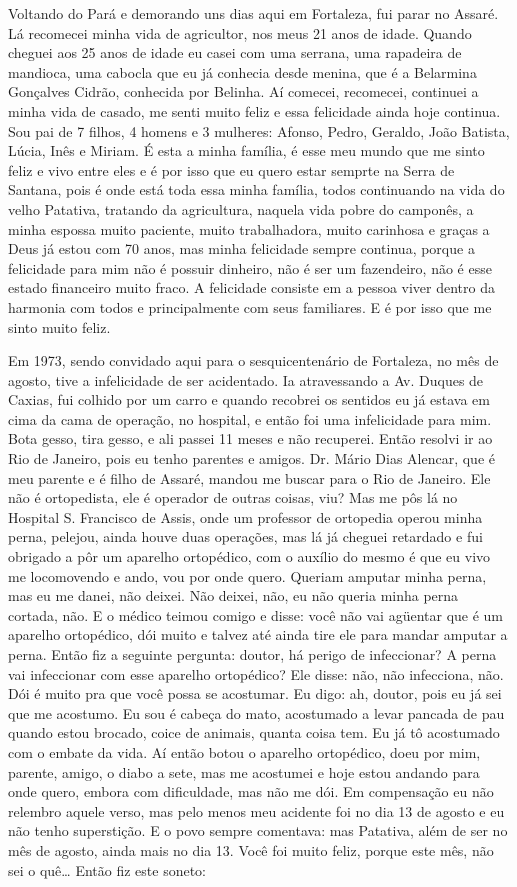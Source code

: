 Voltando do Pará e demorando uns dias aqui em Fortaleza, fui parar no
Assaré. Lá recomecei minha vida de agricultor, nos meus 21 anos de
idade. Quando cheguei aos 25 anos de idade eu casei com uma serrana, uma
rapadeira de mandioca, uma cabocla que eu já conhecia desde menina,
que é a Belarmina Gonçalves Cidrão, conhecida por Belinha. Aí comecei,
recomecei, continuei a minha vida de casado, me senti muito feliz e essa
felicidade ainda hoje continua. Sou pai de 7 filhos, 4 homens e 3
mulheres: Afonso, Pedro, Geraldo, João Batista, Lúcia, Inês e Miriam.
É esta a minha família, é esse meu mundo que me sinto feliz e vivo entre
eles e é por isso que eu quero estar semprte na Serra de Santana, pois é
onde está toda essa minha família, todos continuando na vida do velho
Patativa, tratando da agricultura, naquela vida pobre do camponês, a
minha espossa muito paciente, muito trabalhadora, muito carinhosa e
graças a Deus já estou com 70 anos, mas minha felicidade sempre
continua, porque a felicidade para mim não é possuir dinheiro, não é ser
um fazendeiro, não é esse estado financeiro muito fraco. A felicidade
consiste em a pessoa viver dentro da harmonia com todos e principalmente
com seus familiares. E é por isso que me sinto muito feliz.

Em 1973, sendo convidado aqui para o sesquicentenário de Fortaleza, no
mês de agosto, tive a infelicidade de ser acidentado. Ia atravessando a
Av. Duques de Caxias, fui colhido por um carro e quando recobrei os sentidos eu já estava em cima
da cama de operação, no hospital, e então foi uma infelicidade para mim.
Bota gesso, tira gesso, e ali passei 11 meses e não recuperei. Então
resolvi ir ao Rio de Janeiro, pois eu tenho parentes e amigos. Dr. Mário
Dias Alencar, que é meu parente e é filho de Assaré, mandou me buscar
para o Rio de Janeiro. Ele não é ortopedista, ele é operador de outras
coisas, viu? Mas me pôs lá no Hospital
S. Francisco de Assis, onde um professor de ortopedia operou minha
perna, pelejou, ainda houve duas operações, mas lá já cheguei retardado
e fui obrigado a pôr um aparelho ortopédico, com o auxílio do mesmo é
que eu vivo me locomovendo e ando, vou por onde quero. Queriam amputar
minha perna, mas eu me danei, não deixei. Não deixei, não, eu não queria
minha perna cortada, não. E o médico teimou comigo e disse: você não vai
agüentar que é um aparelho ortopédico, dói muito e talvez até ainda tire
ele para mandar amputar a perna. Então fiz a seguinte pergunta:
doutor, há perigo de infeccionar? A perna vai infeccionar com esse
aparelho ortopédico? Ele disse: não, não infecciona, não. Dói é muito
pra que você possa se acostumar. Eu digo: ah, doutor, pois eu já sei
que me acostumo. Eu sou é cabeça do mato, acostumado a levar pancada de
pau quando estou brocado, coice de animais, quanta coisa tem. Eu já tô
acostumado com o embate da vida. Aí então botou o aparelho ortopédico,
doeu por mim, parente, amigo, o diabo a sete, mas me acostumei e hoje
estou andando para onde quero, embora com dificuldade, mas não me dói.
Em compensação eu não relembro aquele verso, mas pelo menos meu acidente
foi no dia 13 de agosto e eu não tenho superstição. E o povo sempre
comentava: mas Patativa, além de ser no mês de agosto, ainda mais no dia
13. Você foi muito feliz, porque este mês, não sei o quê\ldots{} Então fiz
este soneto:

